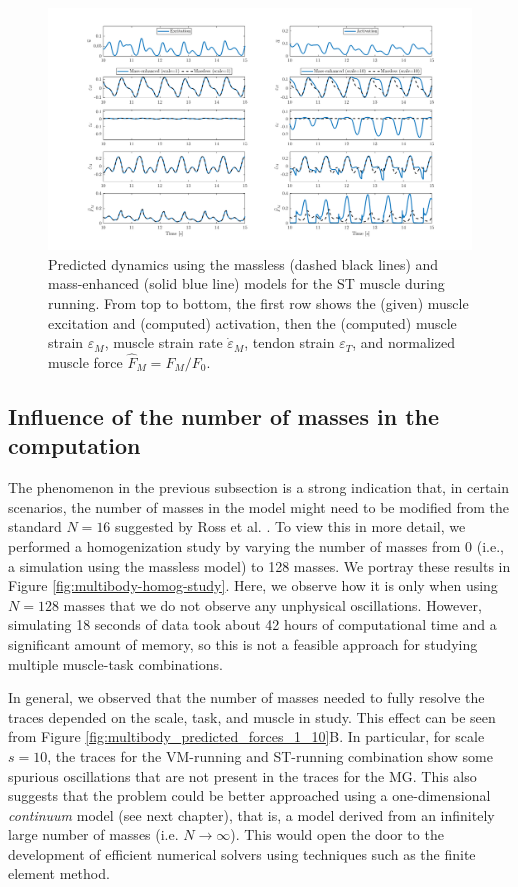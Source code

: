 \documentclass{sfuthesis}
\numberwithin{equation}{section}
\numberwithin{figure}{chapter}
\numberwithin{table}{chapter}
\theoremstyle{definition}
\newcommand{\depsilon}{\dot{\varepsilon}}
\begin{document}
\begin{figure} 
    \centering
    \hspace*{-5.5em}\includegraphics[width=1.25\textwidth]{st-running-strains-strain-rates-forces.png}
    \caption{Predicted dynamics using the massless (dashed black lines) and mass-enhanced (solid blue line) models for the ST muscle during running. From top to bottom, the first row shows the (given) muscle excitation and (computed) activation, then the (computed) muscle strain $\varepsilon_M$, muscle strain rate $\depsilon_M$, tendon strain $\varepsilon_T$, and normalized muscle force $\widehat{F}_M = F_M/F_0$.}
    \label{fig:multibody_traces_ST_running}
\end{figure}

\subsection{Influence of the number of masses in the computation}

The phenomenon in the previous subsection is a strong indication that, in certain scenarios, the number of masses in the model might need to be modified from the standard $N=16$ suggested by Ross et al. \cite{Ross2018-1D}. To view this in more detail, we performed a homogenization study by varying the number of masses from 0 (i.e., a simulation using the massless model) to 128 masses. We portray these results in Figure \ref{fig:multibody-homog-study}. Here, we observe how it is only when using $N=128$ masses that we do not observe any unphysical oscillations. However, simulating 18 seconds of data took about 42 hours of computational time and a significant amount of memory, so this is not a feasible approach for studying multiple muscle-task combinations. 

In general, we observed that the number of masses needed to fully resolve the traces depended on the scale, task, and muscle in study. This effect can be seen from Figure \ref{fig:multibody_predicted_forces_1_10}B. In particular, for scale $s=10$, the traces for the VM-running and ST-running combination show some spurious oscillations that are not present in the traces for the MG. This also suggests that the problem could be better approached using a one-dimensional \textit{continuum} model (see next chapter), that is, a model derived from an infinitely large number of masses (i.e. $N \to \infty$). This would open the door to the development of efficient numerical solvers using techniques such as the finite element method.
\end{document}
